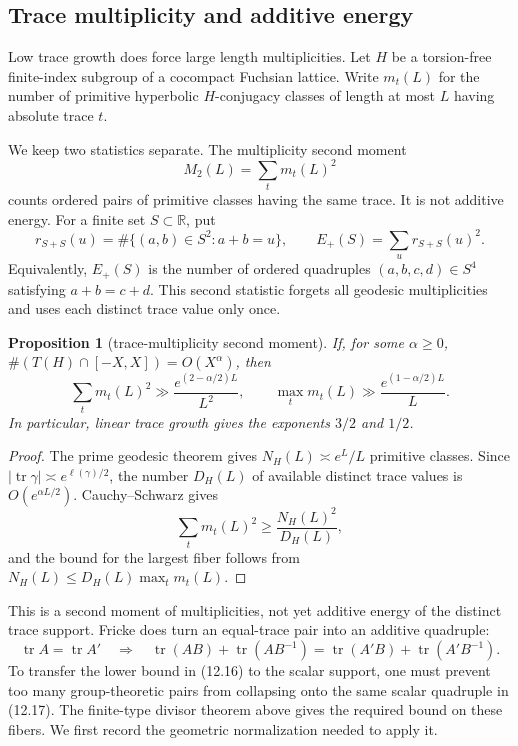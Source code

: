 \documentclass[11pt,reqno]{amsart}
\newtheorem{proposition}[theorem]{Proposition}
\theoremstyle{definition}
\theoremstyle{remark}
\newcommand{\R}{\mathbb R}
\newcommand{\Tr}{\operatorname{tr}}
\begin{document}
\subsection{Trace multiplicity and additive energy}

Low trace growth does force large length multiplicities.  Let \(H\) be a
torsion-free finite-index subgroup of a cocompact Fuchsian lattice.  Write
\(m_t(L)\) for
the number of primitive hyperbolic \(H\)-conjugacy classes of length at most
\(L\) having absolute trace \(t\).

We keep two statistics separate.  The multiplicity second moment
\[
 M_2(L)=\sum_t m_t(L)^2
\]
counts ordered pairs of primitive classes having the same trace.  It is not
additive energy.  For a finite set \(S\subset\R\), put
\[
 r_{S+S}(u)=\#\{(a,b)\in S^2:a+b=u\},
 \qquad
 E_+(S)=\sum_u r_{S+S}(u)^2.
\]
Equivalently, \(E_+(S)\) is the number of ordered quadruples
\((a,b,c,d)\in S^4\) satisfying \(a+b=c+d\).  This second statistic forgets
all geodesic multiplicities and uses each distinct trace value only once.

\begin{proposition}[trace-multiplicity second moment]
\label{prop:collision-energy}
If, for some \(\alpha\ge0\),
\(\#(T(H)\cap[-X,X])=O(X^\alpha)\), then
\[
 \sum_t m_t(L)^2\gg \frac{e^{(2-\alpha/2)L}}{L^2},
 \qquad
 \max_t m_t(L)\gg\frac{e^{(1-\alpha/2)L}}{L}.
\tag{12.16}
\]
In particular, linear trace growth gives the exponents \(3/2\) and \(1/2\).
\end{proposition}

\begin{proof}
The prime geodesic theorem \cite{Roblin,Buser} gives
\(N_H(L)\asymp e^L/L\) primitive classes.  Since
\(|\Tr\gamma|\asymp e^{\ell(\gamma)/2}\), the number \(D_H(L)\) of available
distinct trace values is \(O(e^{\alpha L/2})\).  Cauchy--Schwarz gives
\[
 \sum_t m_t(L)^2\ge \frac{N_H(L)^2}{D_H(L)},
\]
and the bound for the largest fiber follows from
\(N_H(L)\le D_H(L)\max_t m_t(L)\).
\end{proof}

This is a second moment of multiplicities, not yet additive energy of the
distinct trace support.  Fricke does turn an equal-trace pair into an
additive quadruple:
\[
 \Tr A=\Tr A'
 \quad\Longrightarrow\quad
 \Tr(AB)+\Tr(AB^{-1})
 =\Tr(A'B)+\Tr(A'B^{-1}).
\tag{12.17}
\]
To transfer the lower bound in (12.16) to the scalar support, one must prevent
too many group-theoretic pairs from collapsing onto the same scalar
quadruple in (12.17).  The finite-type divisor theorem above gives the
required bound on these fibers.  We first record the geometric normalization
needed to apply it.
\end{document}
